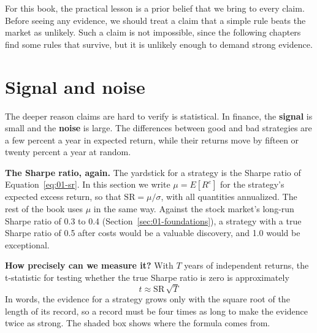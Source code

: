 For this book, the practical lesson is a prior belief that we bring to every claim. Before seeing any evidence, we should treat a claim that a simple rule beats the market as unlikely. Such a claim is not impossible, since the following chapters find some rules that survive, but it is unlikely enough to demand strong evidence.

\section{Signal and noise}
\label{sec:01-signal-noise}

The deeper reason claims are hard to verify is statistical. In finance, the \textbf{signal} is small and the \textbf{noise} is large. The differences between good and bad strategies are a few percent a year in expected return, while their returns move by fifteen or twenty percent a year at random.

\textbf{The Sharpe ratio, again.} The yardstick for a strategy is the Sharpe ratio of Equation~\eqref{eq:01-sr}. In this section we write $\mu = E[R^{e}]$ for the strategy's expected excess return, so that $\mathrm{SR} = \mu/\sigma$, with all quantities annualized. The rest of the book uses $\mu$ in the same way. Against the stock market's long-run Sharpe ratio of 0.3 to 0.4 (Section~\ref{sec:01-foundations}), a strategy with a true Sharpe ratio of 0.5 after costs would be a valuable discovery, and 1.0 would be exceptional.

\textbf{How precisely can we measure it?} With $T$ years of independent returns, the t-statistic for testing whether the true Sharpe ratio is zero is approximately
\begin{equation}
  t \approx \mathrm{SR}\,\sqrt{T}
  \label{eq:01-t}
\end{equation}
In words, the evidence for a strategy grows only with the square root of the length of its record, so a record must be four times as long to make the evidence twice as strong. The shaded box shows where the formula comes from.

